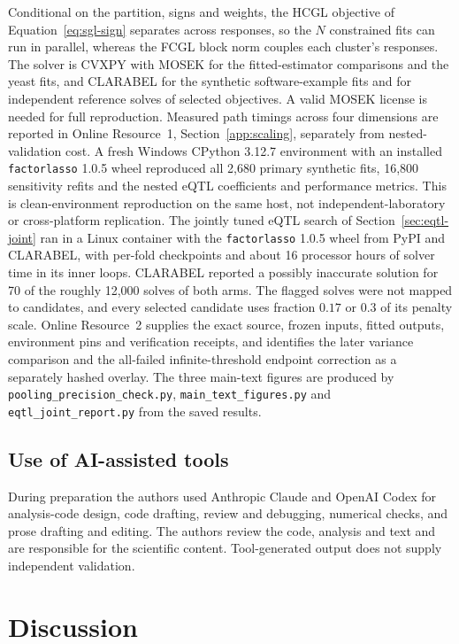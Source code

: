 \documentclass[lineno,pdflatex,sn-basic]{sn-jnl}
\theoremstyle{thmstyleone}
\begin{document}
Conditional on the partition, signs and weights, the HCGL objective of
Equation~\eqref{eq:sgl-sign} separates across responses, so the $N$ constrained
fits can run in parallel, whereas the FCGL block norm couples each cluster's
responses. The solver is CVXPY with MOSEK for the fitted-estimator comparisons
and the yeast fits, and CLARABEL for the synthetic software-example fits and for
independent reference solves of selected objectives. A valid MOSEK license is
needed for full reproduction. Measured path timings across four dimensions are
reported in Online Resource~1, Section~\ref{app:scaling}, separately from
nested-validation cost. A fresh Windows CPython 3.12.7 environment with an
installed \texttt{factorlasso} 1.0.5 wheel reproduced all 2,680 primary
synthetic fits, 16,800 sensitivity refits and the nested eQTL coefficients and
performance metrics. This is clean-environment reproduction on the same host,
not independent-laboratory or cross-platform replication. The jointly tuned
eQTL search of Section~\ref{sec:eqtl-joint} ran in a Linux container with the
\texttt{factorlasso} 1.0.5 wheel from PyPI and CLARABEL, with per-fold
checkpoints and about 16 processor hours of solver time in its inner loops.
CLARABEL reported a possibly inaccurate solution for 70 of the roughly 12,000
solves of both arms. The flagged solves were
not mapped to candidates, and every selected candidate uses fraction $0.17$ or
$0.3$ of its penalty scale. Online Resource~2
supplies the exact source, frozen inputs, fitted outputs, environment pins and
verification receipts, and identifies the later variance comparison and the
all-failed infinite-threshold endpoint correction as a separately hashed
overlay. The three main-text figures are produced by
\texttt{pooling\_precision\_check.py}, \texttt{main\_text\_figures.py} and
\texttt{eqtl\_joint\_report.py} from the saved results.

\subsection{Use of AI-assisted tools}
During preparation the authors used Anthropic Claude and OpenAI Codex for
analysis-code design, code drafting, review and debugging, numerical checks,
and prose drafting and editing. The authors review the code, analysis and text
and are responsible for the scientific content. Tool-generated output does not
supply independent validation.

\FloatBarrier
\section{Discussion} \label{sec:discussion}
\end{document}
